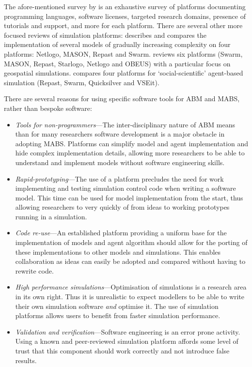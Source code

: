 The afore-mentioned survey by \citet{CynthiaNikolaiandGregoryMadey2009} is an exhaustive survey of platforms documenting programming languages, software licenses, targeted research domains, presence of tutorials and support, and more for each platform. There are several other more focused reviews of simulation platforms: \citet{Railsback2006} describes and compares the implementation of several models of gradually increasing complexity on four platforms: Netlogo, MASON, Repast and Swarm. \citet{Castle2006} reviews six platforms (Swarm, MASON, Repast, Starlogo, Netlogo and OBEUS) with a particular focus on geospatial simulations. \citet{Tobias2004} compares four platforms for `social-scientific' agent-based simulation (Repast, Swarm, Quicksilver and VSEit).

There are several reasons for using specific software tools for \ac{ABM} and \ac{MABS}, rather than bespoke software:
\begin{itemize}
\item \emph{Tools for non-programmers}---The inter-disciplinary nature of \ac{ABM} means than for many researchers software development is a major obstacle in adopting \ac{MABS}. Platforms can simplify model and agent implementation and hide complex implementation details, allowing more researchers to be able to understand and implement models without software engineering skills.
\item \emph{Rapid-prototyping}---The use of a platform precludes the need for work implementing and testing simulation control code when writing a software model. This time can be used for model implementation from the start, thus allowing researchers to very quickly of from ideas to working prototypes running in a simulation.
\item \emph{Code re-use}---An established platform providing a uniform base for the implementation of models and agent algorithm should allow for the porting of these implementations to other models and simulations. This enables collaboration as ideas can easily be adopted and compared without having to rewrite code.
\item \emph{High performance simulations}---Optimisation of simulations is a research area in its own right. Thus it is unrealistic to expect modellers to be able to write their own simulation software \emph{and} optimise it. The use of simulation platforms allows users to benefit from faster simulation performance.
\item \emph{Validation and verification}---Software engineering is an error prone activity. Using a known and peer-reviewed simulation platform affords some level of trust that this component should work correctly and not introduce false results. 
\end{itemize}

